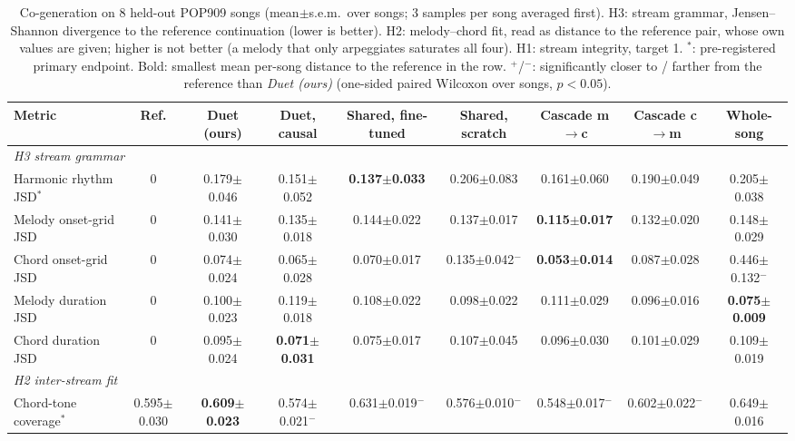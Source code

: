 \begin{table}[htbp]
\caption{Co-generation on 8 held-out POP909 songs (mean$\pm$s.e.m.\ over songs; 3 samples per song averaged first). H3: stream grammar, Jensen--Shannon divergence to the reference continuation (lower is better). H2: melody--chord fit, read as distance to the reference pair, whose own values are given; higher is not better (a melody that only arpeggiates saturates all four). H1: stream integrity, target 1. $^*$: pre-registered primary endpoint. Bold: smallest mean per-song distance to the reference in the row. $^{\mathrm{+}}$/$^{\mathrm{-}}$: significantly closer to / farther from the reference than \emph{Duet (ours)} (one-sided paired Wilcoxon over songs, $p<0.05$).}
\begin{center}
\footnotesize
\setlength{\tabcolsep}{3.5pt}
\begin{tabular}{|l|c|c|c|c|c|c|c|c|}
\hline
\textbf{Metric} & \textbf{Ref.} & \textbf{Duet (ours)} & \textbf{Duet, causal} & \textbf{Shared, fine-tuned} & \textbf{Shared, scratch} & \textbf{Cascade m$\to$c} & \textbf{Cascade c$\to$m} & \textbf{Whole-song} \\
\hline
\multicolumn{9}{|l|}{\textit{H3 stream grammar}} \\
\hline
Harmonic rhythm JSD$^*$ & 0 & 0.179$\pm$0.046 & 0.151$\pm$0.052 & \textbf{0.137$\pm$0.033} & 0.206$\pm$0.083 & 0.161$\pm$0.060 & 0.190$\pm$0.049 & 0.205$\pm$0.038 \\
Melody onset-grid JSD & 0 & 0.141$\pm$0.030 & 0.135$\pm$0.018 & 0.144$\pm$0.022 & 0.137$\pm$0.017 & \textbf{0.115$\pm$0.017} & 0.132$\pm$0.020 & 0.148$\pm$0.029 \\
Chord onset-grid JSD & 0 & 0.074$\pm$0.024 & 0.065$\pm$0.028 & 0.070$\pm$0.017 & 0.135$\pm$0.042$^{\mathrm{-}}$ & \textbf{0.053$\pm$0.014} & 0.087$\pm$0.028 & 0.446$\pm$0.132$^{\mathrm{-}}$ \\
Melody duration JSD & 0 & 0.100$\pm$0.023 & 0.119$\pm$0.018 & 0.108$\pm$0.022 & 0.098$\pm$0.022 & 0.111$\pm$0.029 & 0.096$\pm$0.016 & \textbf{0.075$\pm$0.009} \\
Chord duration JSD & 0 & 0.095$\pm$0.024 & \textbf{0.071$\pm$0.031} & 0.075$\pm$0.017 & 0.107$\pm$0.045 & 0.096$\pm$0.030 & 0.101$\pm$0.029 & 0.109$\pm$0.019 \\
\multicolumn{9}{|l|}{\textit{H2 inter-stream fit}} \\
\hline
Chord-tone coverage$^*$ & 0.595$\pm$0.030 & \textbf{0.609$\pm$0.023} & 0.574$\pm$0.021$^{\mathrm{-}}$ & 0.631$\pm$0.019$^{\mathrm{-}}$ & 0.576$\pm$0.010$^{\mathrm{-}}$ & 0.548$\pm$0.017$^{\mathrm{-}}$ & 0.602$\pm$0.022$^{\mathrm{-}}$ & 0.649$\pm$0.016 \\

\end{tabular}
\end{center}
\end{table}
